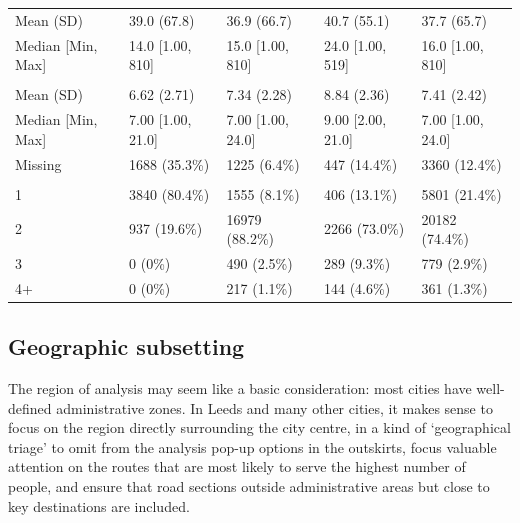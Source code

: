 \documentclass[
]{article}
\begin{document}
\begin{table}[H]
\begin{tabular}{lllll}
\hspace{1em}Mean (SD) & 39.0 (67.8) & 36.9 (66.7) & 40.7 (55.1) & 37.7 (65.7)\\
\hspace{1em}Median [Min, Max] & 14.0 [1.00, 810] & 15.0 [1.00, 810] & 24.0 [1.00, 519] & 16.0 [1.00, 810]\\
\addlinespace[0.3em]
\multicolumn{5}{l}{\textbf{Width (m)}}\\
\hspace{1em}Mean (SD) & 6.62 (2.71) & 7.34 (2.28) & 8.84 (2.36) & 7.41 (2.42)\\
\hspace{1em}Median [Min, Max] & 7.00 [1.00, 21.0] & 7.00 [1.00, 24.0] & 9.00 [2.00, 21.0] & 7.00 [1.00, 24.0]\\
\hspace{1em}Missing & 1688 (35.3\%) & 1225 (6.4\%) & 447 (14.4\%) & 3360 (12.4\%)\\
\addlinespace[0.3em]
\multicolumn{5}{l}{\textbf{N. lanes}}\\
\hspace{1em}1 & 3840 (80.4\%) & 1555 (8.1\%) & 406 (13.1\%) & 5801 (21.4\%)\\
\hspace{1em}2 & 937 (19.6\%) & 16979 (88.2\%) & 2266 (73.0\%) & 20182 (74.4\%)\\
\hspace{1em}3 & 0 (0\%) & 490 (2.5\%) & 289 (9.3\%) & 779 (2.9\%)\\
\hspace{1em}4+ & 0 (0\%) & 217 (1.1\%) & 144 (4.6\%) & 361 (1.3\%)\\
\bottomrule
\end{tabular}
\end{table}

\hypertarget{geographic-subsetting}{%
\subsection{Geographic subsetting}\label{geographic-subsetting}}

The region of analysis may seem like a basic consideration: most cities have well-defined administrative zones.
In Leeds and many other cities, it makes sense to focus on the region directly surrounding the city centre, in a kind of `geographical triage' to omit from the analysis pop-up options in the outskirts, focus valuable attention on the routes that are most likely to serve the highest number of people, and ensure that road sections outside administrative areas but close to key destinations are included.
\end{document}
